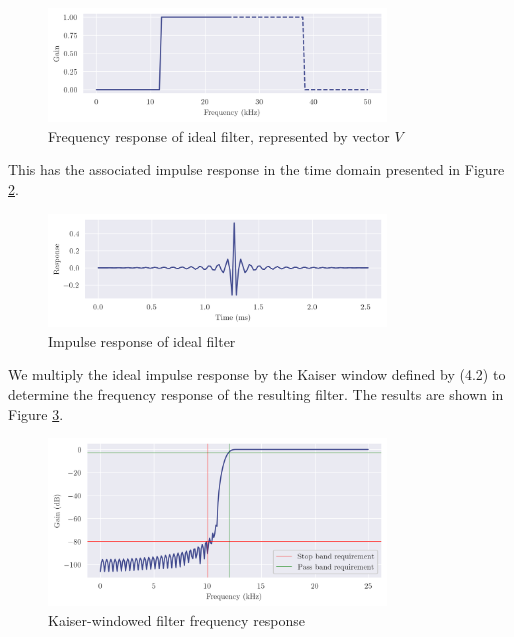 \begin{figure}[ht]
    \centering
    \includegraphics[width=0.8\textwidth]{images/q4_ideal_freqz.png}
    \caption{Frequency response of ideal filter, represented by vector $V$}
    \label{fig:q4_ideal_freqz}
\end{figure}

This has the associated impulse response in the time domain presented in Figure \ref{fig:q4_ideal_impz}.

\begin{figure}[ht]
    \centering
    \includegraphics[width=0.8\textwidth]{images/q4_ideal_impz.png}
    \caption{Impulse response of ideal filter}
    \label{fig:q4_ideal_impz}
\end{figure}

We multiply the ideal impulse response by the Kaiser window defined by (4.2) to determine the frequency response of the resulting filter. The results are shown in Figure \ref{fig:q4_kaiser_freqz}.

\begin{figure}[ht]
    \centering
    \includegraphics[width=0.8\textwidth]{images/q4_kaiser_freqz.png}
    \caption{Kaiser-windowed filter frequency response}
    \label{fig:q4_kaiser_freqz}
\end{figure}

